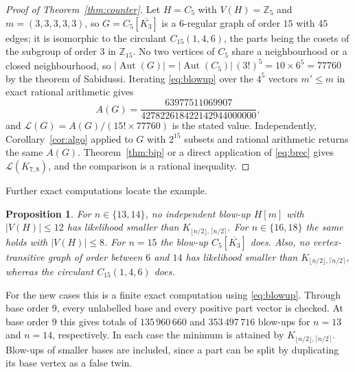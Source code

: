 \documentclass[11pt]{article}
\newtheorem{proposition}[theorem]{Proposition}
\theoremstyle{definition}
\DeclareMathOperator{\Aut}{Aut}
\newcommand{\Lk}{\mathcal{L}}
\newcommand{\Kbal}{K_{\lfloor n/2\rfloor,\lceil n/2\rceil}}
\begin{document}
\begin{proof}[Proof of Theorem~\ref{thm:counter}]
Let $H=C_5$ with $V(H)=\mathbb{Z}_5$ and $m=(3,3,3,3,3)$, so $G=C_5[\overline{K_3}]$ is a $6$-regular graph of order $15$ with $45$ edges; it is isomorphic to the circulant $C_{15}(1,4,6)$, the parts being the cosets of the subgroup of order $3$ in $\mathbb{Z}_{15}$. No two vertices of $C_5$ share a neighbourhood or a closed neighbourhood, so $\lvert\Aut(G)\rvert=\lvert\Aut(C_5)\rvert\,(3!)^5=10\times 6^5=77760$ by the theorem of Sabidussi. Iterating \eqref{eq:blowup} over the $4^5$ vectors $m'\le m$ in exact rational arithmetic gives
\[
A(G)=\frac{63977511069907}{427822618422142944000000},
\]
and $\Lk(G)=A(G)/(15!\times 77760)$ is the stated value. Independently, Corollary~\ref{cor:algo} applied to $G$ with $2^{15}$ subsets and rational arithmetic returns the same $A(G)$. Theorem~\ref{thm:bip} or a direct application of \eqref{eq:brec} gives $\Lk(K_{7,8})$, and the comparison is a rational inequality.
\end{proof}

Further exact computations locate the example.

\begin{proposition}\label{prop:first15}
For $n\in\{13,14\}$, no independent blow-up $H[m]$ with
$\lvert V(H)\rvert\le12$ has likelihood smaller than $\Kbal$.  For
$n\in\{16,18\}$ the same holds with $\lvert V(H)\rvert\le8$.  For $n=15$ the blow-up
$C_5[\overline{K_3}]$ does.  Also, no vertex-transitive graph
of order between $6$ and $14$ has likelihood smaller than $\Kbal$, whereas the
circulant $C_{15}(1,4,6)$ does.
\end{proposition}

For the new cases this is a finite exact computation using
\eqref{eq:blowup}.  Through base order $9$, every unlabelled base and every
positive part vector is checked.  At base order $9$ this gives totals of
$135\,960\,660$ and $353\,497\,716$ blow-ups for $n=13$ and $n=14$,
respectively.  In each case the minimum is attained by $\Kbal$.  Blow-ups of
smaller bases are included, since a part can be split by duplicating its base
vertex as a false twin.
\end{document}
